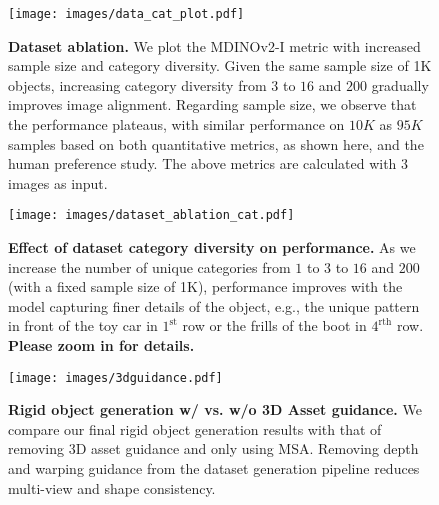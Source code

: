 \begin{figure}[!t]
    \centering
    \texttt{[image: images/data\_cat\_plot.pdf]}
    \vspace{-10pt}
    \caption{{\textbf{Dataset ablation.} We plot the MDINOv2-I metric with increased sample size and category diversity. Given the same sample size of 1K objects, increasing category diversity from $3$ to $16$ and $200$ gradually improves image alignment. Regarding sample size, we observe that the performance plateaus, with similar performance on $10K$ as $95K$ samples based on both quantitative metrics, as shown here, and the human preference study. The above metrics are calculated with $3$ images as input.
    }}
\end{figure}

\begin{figure*}[!t]
    \centering
    \texttt{[image: images/dataset\_ablation\_cat.pdf]}
    \vspace{-15pt}
    \caption{{\textbf{Effect of dataset category diversity on performance.} As we increase the number of unique categories from  $1$ to $3$ to $16$ and $200$ (with a fixed sample size of 1K), performance improves with the model capturing finer details of the object, e.g., the unique pattern in front of the toy car in $1^{\text{st}}$ row or the frills of the boot in $4^{\text{rth}}$ row. \textbf{Please zoom in for details.}
    }}
    \vspace{-10pt}
\end{figure*}


\begin{figure*}[!t]
    \centering
    \texttt{[image: images/3dguidance.pdf]}
    \vspace{-8pt}
    \caption{\textbf{Rigid object generation w/ vs. w/o 3D Asset guidance.} We compare our final rigid object generation results with that of removing 3D asset guidance and only using MSA. Removing depth and warping guidance from the dataset generation pipeline reduces multi-view and shape consistency. 
    }
\end{figure*}

